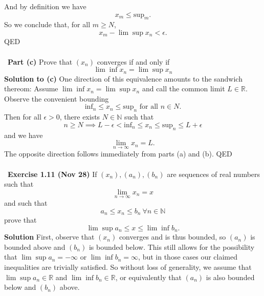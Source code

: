 \documentclass[12 pt]{article}
\newcommand{\R}{\mathbb{R}}
\newcommand{\N}{\mathbb{N}}
\numberwithin{equation}{section}
\begin{document}
{And by definition we have \begin{equation*}
x_m \leq \mbox{sup}_m.
\end{equation*}
So we conclude that, for all $m \geq N$, \begin{equation*}
x_m - \lim \sup x_n < \epsilon.
\end{equation*}
QED\\
\\
\
\textbf{Part (c)} Prove that $(x_n)$ converges if and only if \begin{equation*}
\lim \inf x_n = \lim \sup x_n
\end{equation*}
\textbf{Solution to (c)} One direction of this equivalence amounts to the sandwich thereom: Assume $\lim \inf x_n = \lim \sup x_n$ and call the common limit $L \in \R$. Observe the convenient bounding \begin{equation*}
\mbox{inf}_n \leq x_n \leq \mbox{sup}_n \mbox{ for all } n \in N.
\end{equation*}
Then for all $\epsilon > 0$, there exists $N \in \N$ such that \begin{equation*}
n \geq N \implies L - \epsilon < \mbox{inf}_n \leq x_n \leq \mbox{sup}_n \leq L + \epsilon
\end{equation*}
and we have \begin{equation*}
\lim _{n \to \infty} x_n = L.
\end{equation*}
The opposite direction follows immediately from parts (a) and (b). QED\\
\\
\
\textbf{Exercise 1.11 (Nov 28)} If $(x_n), (a_n), (b_n)$ are sequences of real numbers such that \begin{equation*}
\lim_{n \to \infty} x_n = x
\end{equation*}
and such that \begin{equation*}
a_n \leq x_n \leq b_n \ \forall n \in \N
\end{equation*}
prove that \begin{equation*}
\lim \sup a_n \leq x \leq \lim \inf b_n.
\end{equation*}
\textbf{Solution} First, observe that $(x_n)$ converges and is thus bounded, so $(a_n)$ is bounded above and $(b_n)$ is bounded below. This still allows for the possibility that $\lim \sup a_n = - \infty$ or $\lim \inf b_n = \infty$, but in those cases our claimed inequalities are trivially satisfied. So without loss of generality, we assume that $\lim \sup a_n \in \R$ and $\lim \inf b_n \in \R$, or equivalently that $(a_n)$ is also bounded below and $(b_n)$ above.\\
}
\end{document}

